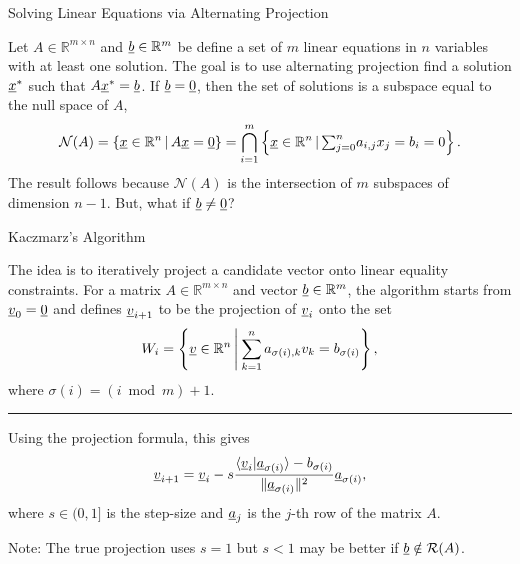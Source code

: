 \documentclass[10pt,letterpaper,english]{beamer}
\begin{document}
\begin{frame}{Solving Linear Equations via Alternating Projection}

Let $A\in\mathbb{R}^{m\times n}$ and $\underline b\in\mathbb{R}^{m}$ be define a set of $m$ linear equations in $n$ variables with at least one solution. The goal is to use alternating projection find a solution $\underline x^{*}$ such that $A\underline x^{*}=\underline b$. If $\underline b=\underline 0$, then the set of solutions is a subspace equal to the null space of $A$,
\[
\mathcal{N}(A)=\left\{ \underline x\in\mathbb{R}^{n}\,|\,A\underline x=\underline 0\right\} =\bigcap_{i=1}^{m}\left\{ \underline x\in\mathbb{R}^{n}\,|\,{\textstyle \sum_{j=0}^{n}}a_{i,j}x_{j}=b_i = 0\right\} .
\]
The result follows because $\mathcal{N}(A)$ is the intersection of $m$ subspaces of dimension $n-1$. But, what if $\underline b\neq\underline 0$?

\end{frame}

\begin{frame}{Kaczmarz's Algorithm}

The idea is to iteratively project a candidate vector onto linear equality constraints. For a matrix $A\in\mathbb{R}^{m\times n}$ and vector $\underline b\in\mathbb{R}^{m}$, the algorithm starts from $\underline{v}_0 = \underline{0}$ and defines $\underline v_{i+1}$ to be the projection of $\underline v_{i}$ onto the set \vspace{-0.5mm}
\[
W_{i}=\left\{ \underline v\in\mathbb{R}^{n}\,\middle|\:\sum_{k=1}^{n}a_{\sigma(i),k}v_{k}=b_{\sigma(i)}\right\} ,
\]
where $\sigma(i)=(i\bmod m)+1$.
\vspace{3mm}

\hrule

\vspace{3mm}

Using the projection formula, this gives  \vspace{-0.5mm}
\begin{equation*}
\underline v_{i+1}=\underline v_{i}- s \frac{\langle\underline v_{i}|\underline a_{\sigma(i)}\rangle-b_{\sigma(i)}}{\text{\ensuremath{\|}}\underline a_{\sigma(i)}\|^{2}}\underline a_{\sigma(i)},
\end{equation*}
where $s\in(0,1]$ is the step-size and $\underline a_{j}$ is the $j$-th row of the matrix $A$. 

\vspace{5mm}
Note: The true projection uses $s=1$ but $s<1$ may be better if $\underline{b} \notin \mathcal{R}(A)$. 
\end{frame}
\end{document}
